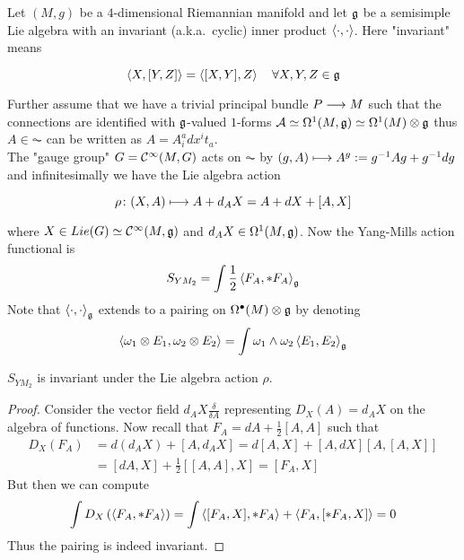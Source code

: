 \begin{example}
  Let $(M,g)$ be a $4$-dimensional Riemannian manifold and let $\mathfrak{g}$ be a semisimple Lie algebra with an invariant (a.k.a.\ cyclic) inner product $\left\langle \cdot , \cdot \right\rangle$. Here "invariant" means

  \begin{equation}
    \left\langle X , [Y,Z] \right\rangle = \left\langle [X,Y] , Z \right\rangle \quad \forall X,Y,Z \in \mathfrak{g}
  \end{equation}

  Further assume that we have a trivial principal bundle $P \longrightarrow M$ such that the connections are identified with $\mathfrak{g}$-valued $1$-forms $\mathcal{A} \simeq \Omega^1 (M, \mathfrak{g}) \simeq \Omega^1 (M) \otimes \mathfrak{g}$ thus $A \in \AC$ can be written as $A = A^a_i dx^i t_a$.\\
  The "gauge group" $G = \mathcal{C}^{\infty}(M, G)$ acts on $\AC$ by $(g, A) \longmapsto A^g := g^{-1} A g + g^{-1} dg$ and infinitesimally we have the Lie algebra action

  \begin{equation}
    \rho \colon (X,A) \longmapsto A + d_A X = A + dX + [A,X]
  \end{equation}

  where $X \in Lie(G) \simeq \mathcal{C}^{\infty}(M, \mathfrak{g})$ and $d_A X \in \Omega^1(M, \mathfrak{g})$. Now the Yang-Mills action functional is
  \begin{equation}
    S_{YM_2} = \int \frac{1}{2} \left\langle F_A , * F_A \right\rangle_{\mathfrak{g}}
  \end{equation}
  Note that $\left\langle \cdot , \cdot \right\rangle_{\mathfrak{g}}$ extends to a pairing on $\Omega^\bullet(M) \otimes \mathfrak{g}$ by denoting
  \begin{equation}
    \left\langle \omega_1 \otimes E_1 , \omega_2 \otimes E_2 \right\rangle = \int \omega_1 \wedge \omega_2 \left\langle E_1 , E_2 \right\rangle_{\mathfrak{g}}
  \end{equation}

  \begin{lem}
    $S_{YM_2}$ is invariant under the Lie algebra action $\rho$.
  \begin{proof}
   Consider the vector field $d_A X \frac{\delta}{\delta A}$ representing $D_X(A) = d_A X$ on the algebra of functions. Now recall that $F_A = dA + \frac{1}{2} [A,A]$ such that
    \begin{align}
      D_X(F_A) &= d(d_A X) + [A, d_A X] = d[A,X] + [A,dX]
       [A,[A,X]]\\
       &= [dA,X] + \frac{1}{2}[[A,A], X] = [F_A, X]
    \end{align}
    But then we can compute
    \begin{align}
      \int D_X \left( \left\langle F_A , *F_A \right\rangle \right) = \int \left\langle [F_A, X] , *F_A \right\rangle + \left\langle F_A ,  [*F_A, X] \right\rangle = 0
    \end{align}
    Thus the pairing is indeed invariant.
  \end{proof}
  \end{lem}


\end{example}
